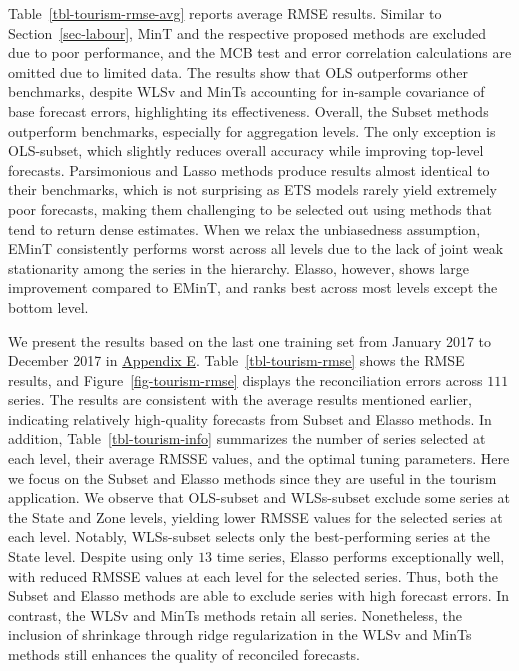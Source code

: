 \documentclass[
  11pt]{article}
\theoremstyle{plain}
\theoremstyle{remark}
\begin{document}
Table~\ref{tbl-tourism-rmse-avg} reports average RMSE results. Similar
to Section~\ref{sec-labour}, MinT and the respective proposed methods
are excluded due to poor performance, and the MCB test and error
correlation calculations are omitted due to limited data. The results
show that OLS outperforms other benchmarks, despite WLSv and MinTs
accounting for in-sample covariance of base forecast errors,
highlighting its effectiveness. Overall, the Subset methods outperform
benchmarks, especially for aggregation levels. The only exception is
OLS-subset, which slightly reduces overall accuracy while improving
top-level forecasts. Parsimonious and Lasso methods produce results
almost identical to their benchmarks, which is not surprising as ETS
models rarely yield extremely poor forecasts, making them challenging to
be selected out using methods that tend to return dense estimates. When
we relax the unbiasedness assumption, EMinT consistently performs worst
across all levels due to the lack of joint weak stationarity among the
series in the hierarchy. Elasso, however, shows large improvement
compared to EMinT, and ranks best across most levels except the bottom
level.

We present the results based on the last one training set from January
2017 to December 2017 in \hyperref[appendix-tourism]{Appendix E}.
Table~\ref{tbl-tourism-rmse} shows the RMSE results, and
Figure~\ref{fig-tourism-rmse} displays the reconciliation errors across
\(111\) series. The results are consistent with the average results
mentioned earlier, indicating relatively high-quality forecasts from
Subset and Elasso methods. In addition, Table~\ref{tbl-tourism-info}
summarizes the number of series selected at each level, their average
RMSSE values, and the optimal tuning parameters. Here we focus on the
Subset and Elasso methods since they are useful in the tourism
application. We observe that OLS-subset and WLSs-subset exclude some
series at the State and Zone levels, yielding lower RMSSE values for the
selected series at each level. Notably, WLSs-subset selects only the
best-performing series at the State level. Despite using only \(13\)
time series, Elasso performs exceptionally well, with reduced RMSSE
values at each level for the selected series. Thus, both the Subset and
Elasso methods are able to exclude series with high forecast errors. In
contrast, the WLSv and MinTs methods retain all series. Nonetheless, the
inclusion of shrinkage through ridge regularization in the WLSv and
MinTs methods still enhances the quality of reconciled forecasts.
\end{document}
